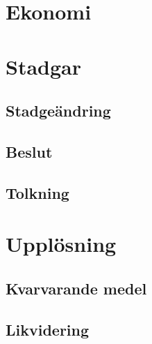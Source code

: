 \documentclass{article}
\begin{document}
\section{Ekonomi}

\section{Stadgar}
\subsection{Stadgeändring}
\subsection{Beslut}
\subsection{Tolkning}

\section{Upplösning}
\subsection{Kvarvarande medel}
\subsection{Likvidering}
\end{document}

